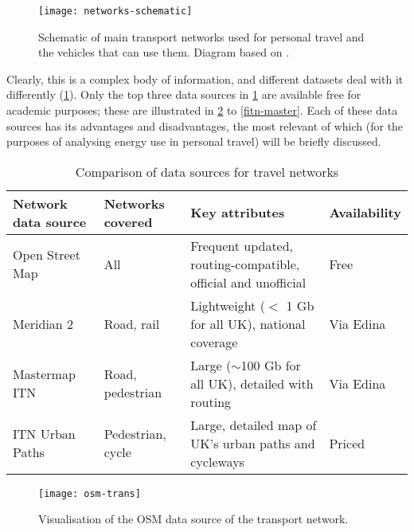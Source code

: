 \begin{figure}[h]
 \begin{center}
 \texttt{[image: networks-schematic]}\end{center}
 \caption[Schematic of transport networks and vehicles]{Schematic of main
transport networks used for personal travel and the vehicles that can use them.
Diagram based on \citet{Bolbol2013}.}
 \label{fnetworks-schematic}
\end{figure}


Clearly, this is a complex body of information, and different datasets deal
with it differently (\cref{tnets}). %
Only the top three data sources in \cref{tnets} are available free for academic
purposes; these are illustrated in \cref{fosm-trans} to \cref{fitn-master}.
Each of these data sources has its advantages and disadvantages, the most
relevant of which (for the purposes of analysing energy use in personal travel)
will be briefly discussed.



\begin{table}[htbp]
\caption{Comparison of data sources for travel networks}
\begin{tabular}{lp{2cm}p{6 cm}l}
\toprule
Network data source & Networks covered & Key attributes & Availability \\
\midrule
Open Street Map & All & Frequent updated, routing-compatible, official and
unofficial & Free \\
Meridian 2 & Road, rail & Lightweight ($<$ 1 Gb for all UK), national coverage &
Via Edina \\
Mastermap ITN & Road, pedestrian & Large ($\sim$100 Gb for all UK), detailed
with routing & Via Edina \\
ITN Urban Paths & Pedestrian, cycle & Large, detailed map of UK's urban paths
and cycleways & Priced \\ \bottomrule
\end{tabular}
\label{tnets}
\end{table}

\begin{figure}[h]
 \begin{center}
 \texttt{[image: osm-trans]}\end{center}
 \caption{Visualisation of the OSM data source of the transport network.}
 \label{fosm-trans}
\end{figure}

